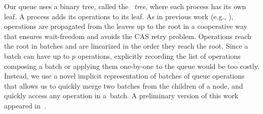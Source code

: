 Our queue uses a binary tree, called the \emph{\ordering\ tree}, where each process has its own leaf.
A process adds its operations to its leaf.
As in previous work (e.g., \cite{DBLP:conf/stoc/AfekDT95,DBLP:conf/fsttcs/JayantiP05}), operations are propagated from the leaves up to the root in a cooperative way that ensures wait-freedom
and avoids the CAS retry problem.
Operations reach the root in batches and are linearized in the order they reach the root.
Since a batch can have up to $p$ operations, explicitly recording the list of operations composing a batch
or applying them one-by-one to the queue would be too costly.
Instead, we use a novel implicit representation of batches
of queue operations that allows us to quickly merge two batches from the children of a node,
and quickly access any  operation in a~batch.
A preliminary version of this work appeared in~\cite{Nad22}.
